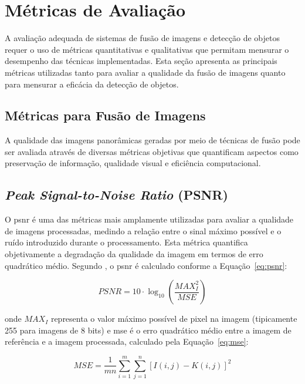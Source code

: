 
\section{Métricas de Avaliação}

A avaliação adequada de sistemas de fusão de imagens e detecção de objetos requer o uso de métricas quantitativas e qualitativas que permitam mensurar o desempenho das técnicas implementadas. Esta seção apresenta as principais métricas utilizadas tanto para avaliar a qualidade da fusão de imagens quanto para mensurar a eficácia da detecção de objetos.

\subsection{Métricas para Fusão de Imagens}

A qualidade das imagens panorâmicas geradas por meio de técnicas de fusão pode ser avaliada através de diversas métricas objetivas que quantificam aspectos como preservação de informação, qualidade visual e eficiência computacional.

\subsection*{\textit{Peak Signal-to-Noise Ratio} (PSNR)}

O \gls{psnr} é uma das métricas mais amplamente utilizadas para avaliar a qualidade de imagens processadas, medindo a relação entre o sinal máximo possível e o ruído introduzido durante o processamento. Esta métrica quantifica objetivamente a degradação da qualidade da imagem em termos de erro quadrático médio. Segundo , o \gls{psnr} é calculado conforme a Equação~\ref{eq:psnr}:

\begin{equation}
\label{eq:psnr}
PSNR = 10 \cdot \log_{10}\left(\frac{MAX^2_I}{MSE}\right)
\end{equation}

\noindent onde $MAX_I$ representa o valor máximo possível de pixel na imagem (tipicamente 255 para imagens de 8 bits) e \gls{mse} é o erro quadrático médio entre a imagem de referência e a imagem processada, calculado pela Equação~\ref{eq:mse}:

\begin{equation}
\label{eq:mse}
MSE = \frac{1}{mn} \sum_{i=1}^{m}\sum_{j=1}^{n}[I(i,j) - K(i,j)]^2
\end{equation}

